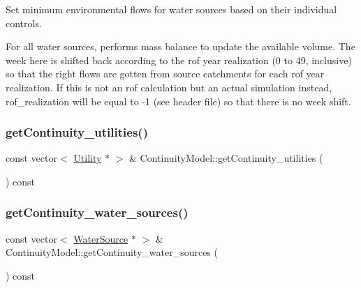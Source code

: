 Set minimum environmental flows for water sources based on their individual controls.

For all water sources, performs mass balance to update the available volume. The week here is shifted back according to the rof year realization (0 to 49, inclusive) so that the right flows are gotten from source catchments for each rof year realization. If this is not an rof calculation but an actual simulation instead, rof\+\_\+realization will be equal to -\/1 (see header file) so that there is no week shift.\mbox{\label{classContinuityModel_a922c1dea6e49d67c87a7fbb34c7bc623}} 
\subsubsection{\texorpdfstring{get\+Continuity\+\_\+utilities()}{getContinuity\_utilities()}}
{\footnotesize\ttfamily const vector$<$ \mbox{\hyperlink{classUtility}{Utility}} $\ast$ $>$ \& Continuity\+Model\+::get\+Continuity\+\_\+utilities (\begin{DoxyParamCaption}{ }\end{DoxyParamCaption}) const}

\mbox{\label{classContinuityModel_ae0dec8510ab216accd44097e5a366bd8}} 
\subsubsection{\texorpdfstring{get\+Continuity\+\_\+water\+\_\+sources()}{getContinuity\_water\_sources()}}
{\footnotesize\ttfamily const vector$<$ \mbox{\hyperlink{classWaterSource}{Water\+Source}} $\ast$ $>$ \& Continuity\+Model\+::get\+Continuity\+\_\+water\+\_\+sources (\begin{DoxyParamCaption}{ }\end{DoxyParamCaption}) const}

\mbox{\label{classContinuityModel_a609fa24135a600af177d1460e0162014}} 
